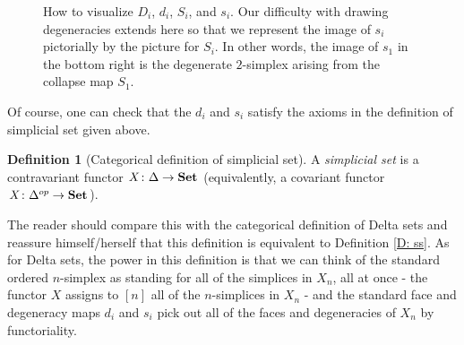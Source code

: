 \documentclass[12pt]{article}
\theoremstyle{plain}
\theoremstyle{definition}
\newtheorem{definition}[theorem]{Definition}
\newcommand{\Set}{\text{\textbf{Set}}}
\begin{document}
\begin{figure}[!htp]
\begin{center}
\end{center}
\caption{How to visualize $D_i$, $d_i$, $S_i$, and $s_i$. Our difficulty with drawing degeneracies extends here so that we represent the image of $s_i$ pictorially by the picture for $S_i$. In other words, the image of $s_1$ in the bottom right is the degenerate $2$-simplex arising from  the collapse map $S_1$.}\label{F: fig12}
\end{figure}


Of course, one can check that the $d_i$ and $s_i$ satisfy the axioms in the definition of simplicial set given above.
 


\begin{definition}[Categorical definition of simplicial set]
A \emph{simplicial set} is a contravariant functor $X\colon \Delta\to \Set$ (equivalently, a covariant functor $X\colon  \Delta^{op}\to \Set$). 
\end{definition}


The reader should compare this with the categorical definition of Delta sets and reassure himself/herself that this definition is equivalent to Definition \ref{D: ss}. 
As for Delta sets, the power in this definition is that we can think of the standard ordered $n$-simplex as standing for all of the simplices in $X_n$, all at once - the functor $X$ assigns to $[n]$ all of the $n$-simplices in $X_n$ - and the standard face and degeneracy maps $d_i$ and $s_i$  pick out all of the faces and degeneracies  of $X_n$ by functoriality.
\end{document}
